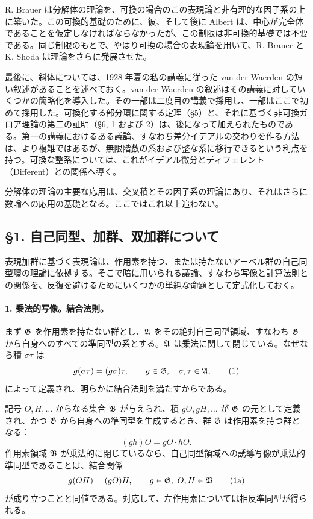 R. Brauer は分解体の理論を、可換の場合のこの表現論と非有理的な因子系の上に築いた。この可換的基礎のために、彼、そして後に Albert は、中心が完全体であることを仮定しなければならなかったが、この制限は非可換的基礎では不要である。同じ制限のもとで、やはり可換の場合の表現論を用いて、R. Brauer と K. Shoda は理論をさらに発展させた。

最後に、斜体については、1928 年夏の私の講義に従った van der Waerden の短い叙述があることを述べておく。van der Waerden の叙述はその講義に対していくつかの簡略化を導入した。その一部は二度目の講義で採用し、一部はここで初めて採用した。可換化する部分環に関する定理（§5）と、それに基づく非可換ガロア理論の第二の証明（§6, 1 および 2）は、後になって加えられたものである。第一の講義におけるある議論、すなわち差分イデアルの交わりを作る方法は、より複雑ではあるが、無限階数の系および整な系に移行できるという利点を持つ。可換な整系については、これがイデアル微分とディフェレント（Different）との関係へ導く。

分解体の理論の主要な応用は、交叉積とその因子系の理論にあり、それはさらに数論への応用の基礎となる。ここではこれ以上追わない。

\subsection*{§1. 自己同型、加群、双加群について}

表現加群に基づく表現論は、作用素を持つ、または持たないアーベル群の自己同型環の理論に依拠する。そこで暗に用いられる議論、すなわち写像と計算法則との関係を、反復を避けるためにいくつかの単純な命題として定式化しておく。

\paragraph{1. 乗法的写像。結合法則。}
まず \(\mathfrak G\) を作用素を持たない群とし、\(\mathfrak A\) をその絶対自己同型領域、すなわち \(\mathfrak G\) から自身へのすべての準同型の系とする。\(\mathfrak A\) は乗法に関して閉じている。なぜなら積 \(\sigma\tau\) は
\[
        g(\sigma\tau)=(g\sigma)\tau,
        \qquad g\in\mathfrak G,\quad \sigma,\tau\in\mathfrak A,                       \tag{1}
\]
によって定義され、明らかに結合法則を満たすからである。

記号 \(O,H,\ldots\) からなる集合 \(\mathfrak B\) が与えられ、積 \(gO,gH,\ldots\) が \(\mathfrak G\) の元として定義され、かつ \(\mathfrak G\) から自身への準同型を生成するとき、群 \(\mathfrak G\) は作用素を持つ群となる：
\[
        (gh)O=gO\cdot hO.
\]
作用素領域 \(\mathfrak B\) が乗法的に閉じているなら、自己同型領域への誘導写像が乗法的準同型であることは、結合関係
\[
        g(OH)=(gO)H,
        \qquad g\in\frG,
        \ O,H\in\frB                                                   \tag{1a}
\]
が成り立つことと同値である。対応して、左作用素については相反準同型が得られる。

